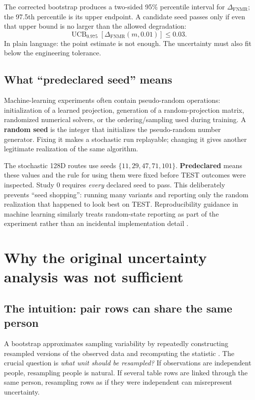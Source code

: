 \documentclass[10pt,a4paper]{article}
\newcommand{\fnmr}{\mathrm{FNMR}}
\newcommand{\DeltaFNMR}{\Delta_{\fnmr}}
\begin{document}
The corrected bootstrap produces a two-sided 95\% percentile interval for $\DeltaFNMR$; the
97.5th percentile is its upper endpoint. A candidate seed passes only if even that upper
bound is no larger than the allowed degradation:
\begin{equation}
\operatorname{UCB}_{0.975}\left[\DeltaFNMR(m,0.01)\right]\le 0.03.
\end{equation}
In plain language: the point estimate is not enough. The uncertainty must also fit below the
engineering tolerance.

\subsection{What ``predeclared seed'' means}

Machine-learning experiments often contain pseudo-random operations: initialization of a
learned projection, generation of a random-projection matrix, randomized numerical solvers,
or the ordering/sampling used during training. A \textbf{random seed} is the integer that
initializes the pseudo-random number generator. Fixing it makes a stochastic run replayable;
changing it gives another legitimate realization of the same algorithm.

The stochastic 128D routes use seeds $\{11,29,47,71,101\}$. \textbf{Predeclared} means these
values and the rule for using them were fixed before TEST outcomes were inspected. Study 0
requires \emph{every} declared seed to pass. This deliberately prevents ``seed shopping'':
running many variants and reporting only the random realization that happened to look best
on TEST. Reproducibility guidance in machine learning similarly treats random-state reporting
as part of the experiment rather than an incidental implementation detail \cite{pineau2021}.

\section{Why the original uncertainty analysis was not sufficient}\label{sec:defect}

\subsection{The intuition: pair rows can share the same person}

A bootstrap approximates sampling variability by repeatedly constructing resampled versions
of the observed data and recomputing the statistic \cite{efron1993}. The crucial question is
\emph{what unit should be resampled?} If observations are independent people, resampling
people is natural. If several table rows are linked through the same person, resampling rows
as if they were independent can misrepresent uncertainty.
\end{document}
